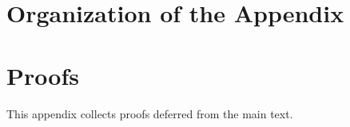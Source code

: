 \documentclass{uai2026} %
\newtheorem*{remark}{Remark}
\newcommand{\appendixproofs}{}
\newcommand{\1}{\mathbf{1}}
\begin{document}



\section{Organization of the Appendix}

\section{Proofs}
\label{app:proofs}
This appendix collects proofs deferred from the main text.

\appendixproofs
\end{document}

